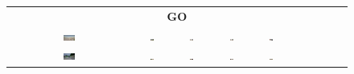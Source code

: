 \begin{figure}
\begin{tabular}{cccccccccc}
        \multicolumn{10}{c}{\textbf{GO}} \\
        \includegraphics[width=0.1\textwidth]{img/diversity/go_01.png} &
        \includegraphics[width=0.1\textwidth]{img/diversity/go_02.png} &
        \includegraphics[width=0.1\textwidth]{img/diversity/go_03.png} &
        \includegraphics[width=0.1\textwidth]{img/diversity/go_04.png} &
        \includegraphics[width=0.1\textwidth]{img/diversity/go_05.png} & \\
        \includegraphics[width=0.1\textwidth]{img/diversity/go_06.png} &
        \includegraphics[width=0.1\textwidth]{img/diversity/go_07.png} &
        \includegraphics[width=0.1\textwidth]{img/diversity/go_08.png} &
        \includegraphics[width=0.1\textwidth]{img/diversity/go_09.png} &
        \includegraphics[width=0.1\textwidth]{img/diversity/go_10.png} \\


\end{tabular}
\end{figure}

